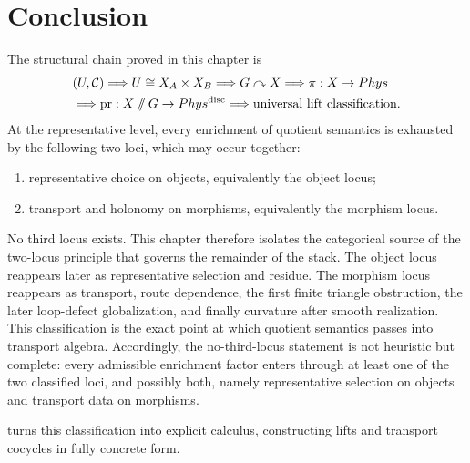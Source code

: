 \section{Conclusion}
\label{sec:locus-conclusion}
The structural chain proved in this chapter is
\[
	\begin{aligned}
		 & (U,\mathcal C)
		\Longrightarrow
		U\cong X_A\times X_B
		\Longrightarrow
		G\curvearrowright X
		\Longrightarrow
		\pi:X\to Phys
		\\
		 & \Longrightarrow
		\operatorname{pr}:X\mathbin{/\mkern-6mu/} G\to Phys^{\mathrm{disc}}
		\Longrightarrow
		\text{universal lift classification}.
	\end{aligned}
\]
At the representative level, every enrichment of quotient semantics is
exhausted by the following two loci, which may occur together:
\begin{enumerate}[label=\textup{(\roman*)}]
	\item representative choice on objects, equivalently the object locus;
	\item transport and holonomy on morphisms, equivalently the morphism
	      locus.
\end{enumerate}
No third locus exists.
	This chapter therefore isolates the categorical source of the two-locus
	principle that governs the remainder of the stack.  The object locus
	reappears later as representative selection and residue.  The morphism
	locus reappears as transport, route dependence, the first finite triangle
	obstruction, the later loop-defect globalization, and finally curvature after smooth realization.  This
	classification is the exact point at which quotient semantics passes
	into transport algebra.
	Accordingly, the no-third-locus statement is not heuristic but
	complete: every admissible enrichment factor enters through at least
	one of the two classified loci, and possibly both, namely
	representative selection on objects and transport data on
	morphisms.

 turns this classification into explicit calculus,
constructing lifts and transport cocycles in fully concrete form.

\begin{chapterclosing}
\end{chapterclosing}
